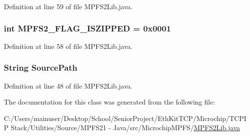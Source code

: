 Definition at line 59 of file M\+P\+F\+S2\+Lib.\+java.

\hypertarget{class_microchip_m_p_f_s_1_1_m_p_f_s2_lib_adfa3cd89f0945610db64b6fceafb9254}{}
\subsubsection[{M\+P\+F\+S2\+\_\+\+F\+L\+A\+G\+\_\+\+I\+S\+Z\+I\+P\+P\+E\+D}]{\setlength{\rightskip}{0pt plus 5cm}int M\+P\+F\+S2\+\_\+\+F\+L\+A\+G\+\_\+\+I\+S\+Z\+I\+P\+P\+E\+D = 0x0001}\label{class_microchip_m_p_f_s_1_1_m_p_f_s2_lib_adfa3cd89f0945610db64b6fceafb9254}


Definition at line 58 of file M\+P\+F\+S2\+Lib.\+java.

\hypertarget{class_microchip_m_p_f_s_1_1_m_p_f_s2_lib_a9286b4d01d45bd2faf1b312da170fdfc}{}
\subsubsection[{Source\+Path}]{\setlength{\rightskip}{0pt plus 5cm}String Source\+Path}\label{class_microchip_m_p_f_s_1_1_m_p_f_s2_lib_a9286b4d01d45bd2faf1b312da170fdfc}


Definition at line 48 of file M\+P\+F\+S2\+Lib.\+java.



The documentation for this class was generated from the following file\+:\begin{DoxyCompactItemize}
\item 
C\+:/\+Users/mainuser/\+Desktop/\+School/\+Senior\+Project/\+Eth\+Kit\+T\+C\+P/\+Microchip/\+T\+C\+P\+I\+P Stack/\+Utilities/\+Source/\+M\+P\+F\+S21 -\/ Java/src/\+Microchip\+M\+P\+F\+S/\hyperlink{_m_p_f_s2_lib_8java}{M\+P\+F\+S2\+Lib.\+java}\end{DoxyCompactItemize}

